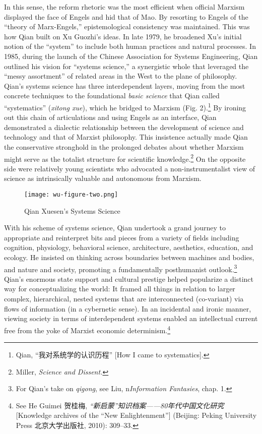 \documentclass{tufte-handout}
\begin{document}
\begin{CJK*}{UTF8}{gbsn}
In this sense, the reform rhetoric was the most efficient when official
Marxism displayed the face of Engels and hid that of Mao. By resorting
to Engels of the ``theory of Marx-Engels,'' epistemological consistency
was maintained. This was how Qian built on Xu Guozhi's ideas. In late
1979, he broadened Xu's initial notion of the ``system'' to include both
human practices and natural processes. In 1985, during the launch of the
Chinese Association for Systems Engineering, Qian outlined his vision
for ``systems science,'' a synergistic whole that leveraged the ``messy
assortment'' of related areas in the West to the plane of philosophy.
Qian's systems science has three interdependent layers, moving from the
most concrete techniques to the foundational \emph{basic science} that
Qian called ``systematics'' (\emph{xitong xue}), which he bridged to
Marxism (Fig. 2).\footnote{Qian, ``我对系统学的认识历程'' {[}How I came
  to systematics{]}.} By ironing out this chain of articulations and
using Engels as an interface, Qian demonstrated a dialectic relationship
between the development of science and technology and that of Marxist
philosophy. This insistence actually made Qian the conservative
stronghold in the prolonged debates about whether Marxism might serve as
the totalist structure for scientific knowledge.\footnote{Miller,
  \emph{Science and Dissent.}} On the opposite side were relatively
young scientists who advocated a non-instrumentalist view of science as
intrinsically valuable and autonomous from Marxism.

\begin{figure}
    \centering
    \texttt{[image: wu-figure-two.png]}
    \caption{Qian Xuesen's Systems Science}
    \label{fig:two}
\end{figure}

With his scheme of systems science, Qian undertook a grand journey to
appropriate and reinterpret bits and pieces from a variety of fields
including cognition, physiology, behavioral science, architecture,
aesthetics, education, and ecology. He insisted on thinking across
boundaries between machines and bodies, and nature and society,
promoting a fundamentally posthumanist outlook.\footnote{For Qian's take
  on \emph{qigong}, see Liu, n\emph{Information Fantasies}, chap. 1.}
Qian's enormous state support and cultural prestige helped popularize a
distinct way for conceptualizing the world: It framed all things in
relation to larger complex, hierarchical, nested systems that are
interconnected (co-variant) via flows of information (in a cybernetic
sense). In an incidental and ironic manner, viewing society in terms of
interdependent systems enabled an intellectual current free from the
yoke of Marxist economic determinism.\footnote{See He Guimei 贺桂梅,
  \emph{``新启蒙''知识档案------80年代中国文化研究} {[}Knowledge
  archives of the ``New Enlightenment''{]} (Beijing: Peking University
  Press 北京大学出版社, 2010): 309--33.}
  
\end{CJK*}
\end{document}
